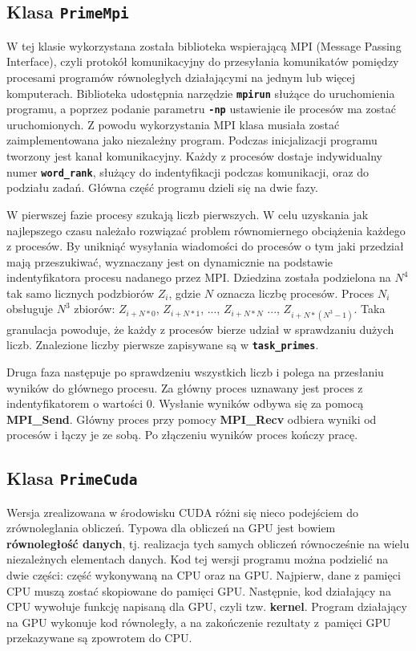 \documentclass[12pt, twoside, hidelinks, a4paper]{article}
\begin{document}
\subsection{Klasa \textbf{\texttt{PrimeMpi}}}
W tej klasie wykorzystana została biblioteka wspierającą MPI (Message Passing Interface), czyli protokół komunikacyjny do przesyłania komunikatów pomiędzy procesami programów równoległych działającymi na jednym lub więcej komputerach.  Biblioteka udostępnia narzędzie \textbf{\texttt{mpirun}} służące do uruchomienia programu, a poprzez podanie parametru \textbf{\texttt{-np}} ustawienie ile procesów ma zostać uruchomionych. Z powodu wykorzystania MPI klasa musiała zostać zaimplementowana jako niezależny program. Podczas inicjalizacji programu tworzony jest kanał komunikacyjny. Każdy z procesów dostaje indywidualny numer \textbf{\texttt{word\_rank}}, służący do indentyfikacji podczas komunikacji, oraz do podziału zadań. Główna część programu dzieli się na dwie fazy.

W pierwszej fazie procesy szukają liczb pierwszych. W celu uzyskania jak najlepszego czasu należało rozwiązać problem równomiernego obciążenia każdego z procesów. By unikniąć wysyłania wiadomości do procesów o tym jaki przedział mają przeszukiwać, wyznaczany jest on dynamicznie na podstawie indentyfikatora procesu nadanego przez MPI. Dziedzina została podzielona na $N^4$ tak samo licznych podzbiorów $Z_i$, gdzie $N$ oznacza liczbę procesów. Proces $N_i$ obsługuje $N^3$ zbiorów: $Z_{i+N*0}$, $Z_{i+N*1}$, ..., $Z_{i + N*N}$ ..., $Z_{i+ N*(N^3-1)}$. Taka granulacja powoduje, że każdy z procesów bierze udział w sprawdzaniu dużych liczb. Znalezione liczby pierwsze zapisywane są w \textbf{\texttt{task\_primes}}.

Druga faza następuje po sprawdzeniu wszystkich liczb i polega na przesłaniu wyników do głównego procesu. Za główny proces uznawany jest proces z indentyfikatorem o wartości $0$. Wysłanie wyników odbywa się za pomocą \textbf{MPI\_Send}. Główny proces przy pomocy \textbf{MPI\_Recv} odbiera wyniki od procesów i łączy je ze sobą. Po złączeniu wyników proces kończy pracę.      

\subsection{Klasa \textbf{\texttt{PrimeCuda}}}
Wersja zrealizowana w środowisku CUDA różni się nieco podejściem do zrównoleglania obliczeń. Typowa dla obliczeń na GPU jest bowiem \textbf{równoległość danych}, tj. realizacja tych samych obliczeń równocześnie na wielu niezależnych elementach danych.
Kod tej wersji programu można podzielić na dwie części: część wykonywaną na CPU oraz na GPU. Najpierw, dane z pamięci CPU muszą zostać skopiowane do pamięci GPU. Następnie, kod działający na CPU wywołuje funkcję napisaną dla GPU, czyli tzw. \textbf{kernel}. Program działający na GPU wykonuje kod równoległy, a na zakończenie rezultaty z~pamięci GPU przekazywane są zpowrotem do CPU.
\end{document}
